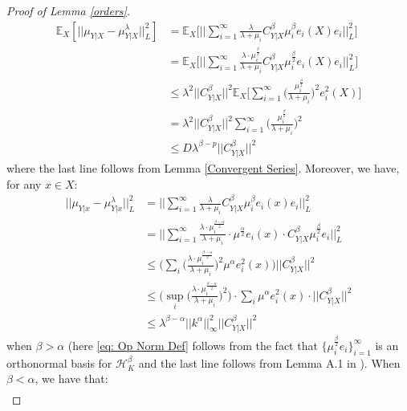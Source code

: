 \documentclass[accepted]{article}
\theoremstyle{definition}
\begin{document}
\begin{proof}[Proof of Lemma \ref{orders}]
\begin{align*}
    \mathbb{E}_{X}[||\mu_{Y|X} - \mu^{\lambda}_{Y|X}||^2_{L}] & = \mathbb{E}_{X}\Big[\Big|\Big|\sum_{i = 1}^{\infty} \frac{\lambda}{\lambda + \mu_i} C^{\beta}_{Y|X} \mu^{\beta}_i e_i(X)e_i\Big|\Big|^2_{L}\Big] \\
    & = \mathbb{E}_{X}\Big[\Big|\Big|\sum_{i = 1}^{\infty} \frac{\lambda \cdot \mu^{\frac{\beta}{2}}_i}{\lambda + \mu_i} C^{\beta}_{Y|X} \mu^{\frac{\beta}{2}}_i e_i(X)e_i\Big|\Big|^2_{L}\Big] \\
    & \leq \lambda^2 ||C^{\beta}_{Y|X}||^2 \mathbb{E}_{X}\Big[\sum_{i = 1}^{\infty} \Big(\frac{\mu^{\frac{\beta}{2}}_i}{\lambda + \mu_i}\Big)^2 e^2_i(X)\Big] \\
    & = \lambda^{2} ||C_{Y|X}^{\beta}||^2 \sum_{i = 1}^{\infty} \Big(\frac{\mu^{\frac{\beta}{2}}_i}{\lambda + \mu_i}\Big)^2 \\
    & \leq D\lambda^{\beta - p} ||C_{Y|X}^{\beta}||^2
\end{align*}
where the last line follows from Lemma \ref{Convergent Series}. Moreover, we have, for any $x \in X$:
\begin{align}
    ||\mu_{Y|x} - \mu^{\lambda}_{Y|x}||^2_{L} &= \Big|\Big|\sum_{i = 1}^{\infty} \frac{\lambda}{\lambda + \mu_i} C^{\beta}_{Y|X} \mu^{\beta}_i e_i(x)e_i\Big|\Big|^2_{L} \nonumber \\
    & = \Big|\Big|\sum_{i = 1}^{\infty} \frac{\lambda \cdot \mu_i^{\frac{\beta - \alpha}{2}}}{\lambda + \mu_i} \cdot \mu^{\frac{\alpha}{2}}e_i(x) \cdot C^{\beta}_{Y|X} \mu^{\frac{\beta}{2}}_i e_i\Big|\Big|^2_{L} \nonumber \\
    & \leq \Big(\sum_i \Big(\frac{\lambda \cdot \mu_i^{\frac{\beta - \alpha}{2}}}{\lambda + \mu_i}\Big)^2 \mu^{\alpha}e^2_i(x)\Big) ||C^{\beta}_{Y|X}||^2 \label{eq: Op Norm Def} \\
    & \leq \Big(\sup_{i} \Big(\frac{\lambda \cdot \mu_i^{\frac{\beta - \alpha}{2}}}{\lambda + \mu_i}\Big)^2\Big) \cdot \sum_i \mu^{\alpha} e^2_i(x) \cdot ||C^{\beta}_{Y|X}||^2 \nonumber \\
    & \leq \lambda^{\beta - \alpha} ||k^{\alpha}||^2_{\infty}||C^{\beta}_{Y|X}||^2 \nonumber
\end{align}
when $\beta > \alpha$ (here \eqref{eq: Op Norm Def} follows from the fact that $\{\mu_i^{\frac{\beta}{2}}e_i\}_{i = 1}^{\infty}$ is an orthonormal basis for $\mathcal{H}_{K}^{\beta}$ and the last line follows from Lemma A.1 in \cite{fischer2020sobolev}). When $\beta < \alpha$, we have that:
\begin{align*}

\end{align*}
\end{proof}
\end{document}
